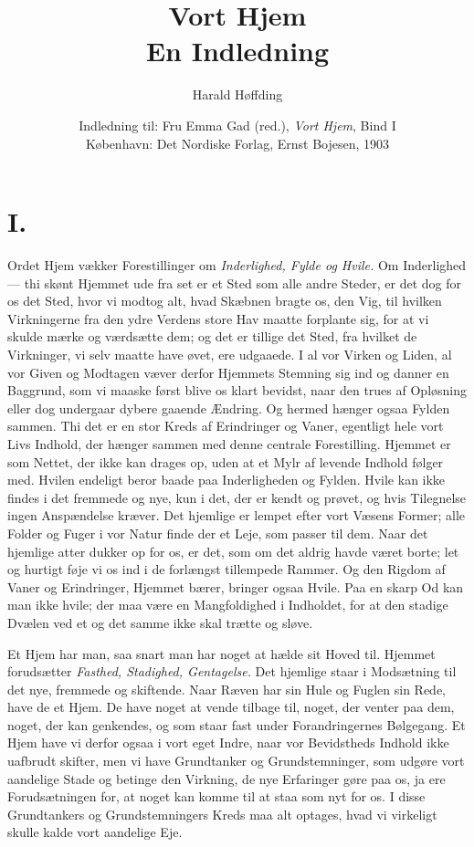 \documentclass[12pt,a4paper]{article}
\title{\textbf{Vort Hjem}\\[6pt]
  \large En Indledning}
\author{Harald Høffding}
\date{Indledning til: Fru Emma Gad (red.),
  \emph{Vort Hjem}, Bind I\\
  København: Det Nordiske Forlag, Ernst Bojesen, 1903}
\newcommand{\opage}[1]{\marginnote{\footnotesize\textit{[#1]}}}
\begin{document}
\maketitle
\thispagestyle{fancy}

\bigskip

\section*{I.}

\noindent \opage{3}Ordet Hjem vækker Forestillinger om \emph{Inderlighed, Fylde og Hvile.}
Om Inderlighed --- thi skønt Hjemmet ude fra set er et Sted som alle andre
Steder, er det dog for os det Sted, hvor vi modtog alt, hvad Skæbnen bragte
os, den Vig, til hvilken Virkningerne fra den ydre Verdens store Hav maatte
forplante sig, for at vi skulde mærke og værdsætte dem; og det er tillige det
Sted, fra hvilket de Virkninger, vi selv maatte have øvet, ere udgaaede. I al
vor Virken og Liden, al vor Given og Modtagen væver derfor Hjemmets Stemning
sig ind og danner en Baggrund, som vi maaske først blive os klart bevidst,
naar den trues af Opløsning eller dog undergaar dybere gaaende Ændring. Og
hermed hænger ogsaa Fylden sammen. Thi det er en stor Kreds af Erindringer og
Vaner, egentligt hele vort Livs Indhold, der hænger sammen med denne centrale
Forestilling. Hjemmet er som Nettet, der ikke kan drages op, uden at et Mylr
af levende Indhold følger med. Hvilen endeligt beror baade paa Inderlig\-heden
og Fylden. Hvile kan ikke findes i det fremmede og nye, kun i det, der er
kendt og prøvet, og hvis Tilegnelse ingen Anspændelse kræver. Det hjemlige er
lempet efter vort Væsens Former; alle Folder og Fuger i vor Natur finde der et
Leje, som passer til dem. Naar det hjemlige atter dukker op for os, er det,
som om det aldrig havde været borte; let og hurtigt føje vi os ind i de
forlængst tillempede Rammer. Og den Rigdom af Vaner og Erindringer, Hjemmet
bærer, bringer ogsaa Hvile. Paa en skarp Od kan man ikke
\opage{4}hvile; der maa være
en Mangfoldighed i Indholdet, for at den stadige Dvælen ved et og det samme
ikke skal trætte og sløve.

Et Hjem har man, saa snart man har noget at hælde sit Hoved til. Hjemmet
forudsætter \emph{Fasthed, Stadighed, Gentagelse.} Det hjemlige staar i Modsætning
til det nye, fremmede og skiftende. Naar Ræven har sin Hule og Fuglen sin
Rede, have de et Hjem. De have noget at vende tilbage til, noget, der venter
paa dem, noget, der kan genkendes, og som staar fast under Forandringernes
Bølgegang. Et Hjem have vi derfor ogsaa i vort eget Indre, naar vor Bevidstheds
Indhold ikke uafbrudt skifter, men vi have Grundtanker og Grundstemninger, som
udgøre vort aandelige Stade og betinge den Virkning, de nye Erfaringer gøre
paa os, ja ere Forudsætningen for, at noget kan komme til at staa som nyt for
os. I disse Grundtankers og Grundstemningers Kreds maa alt optages, hvad vi
virkeligt skulle kalde vort aandelige Eje.
\end{document}
